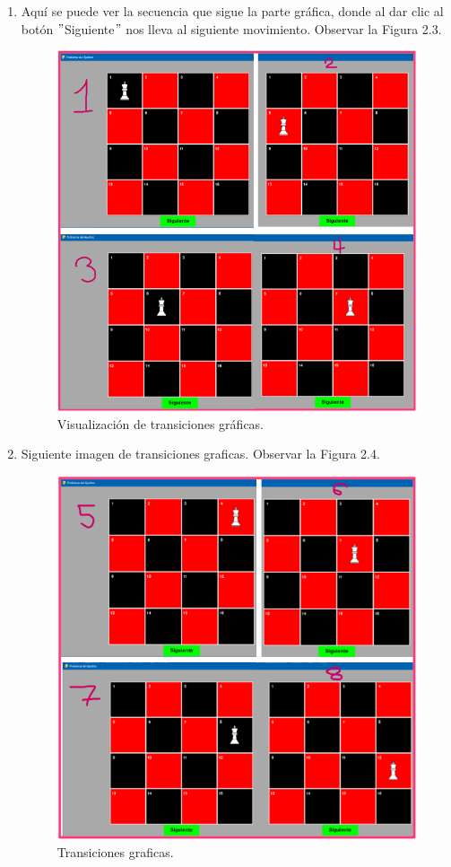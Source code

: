 \begin{enumerate}
\newpage
\item Aquí se puede ver la secuencia que sigue la parte gráfica, donde al dar clic al botón $"$Siguiente$"$ nos lleva al siguiente movimiento. Observar la Figura 2.3.
\begin{figure}[h]
    \begin{center}
    \includegraphics[width=0.8\linewidth]{Images/Cap2.png}
    \end{center}
\caption{Visualización de transiciones gráficas.}
\label{fig:imagen}
\end{figure}

\newpage
\item Siguiente imagen de transiciones graficas. Observar la Figura 2.4.
\begin{figure}[h]
    \begin{center}
    \includegraphics[width=0.7\linewidth]{Images/Cap3.png}
    \end{center}
\caption{Transiciones graficas.}
\label{fig:imagen}
\end{figure}


\end{enumerate}
